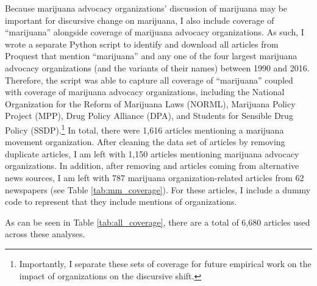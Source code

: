 Because marijuana advocacy organizations' discussion of marijuana may be important for discursive change on marijuana, I also include coverage of ``marijuana'' alongside coverage of marijuana advocacy organizations. As such, I wrote a separate Python script to identify and download all articles from Proquest that mention ``marijuana'' and any one of the four largest marijuana advocacy organizations (and the variants of their names) between 1990 and 2016. Therefore, the script was able to capture all coverage of ``marijuana'' coupled with coverage of marijuana advocacy organizations, including the National Organization for the Reform of Marijuana Laws (NORML), Marijuana Policy Project (MPP), Drug Policy Alliance (DPA), and Students for Sensible Drug Policy (SSDP).\footnote{Importantly, I separate these sets of coverage for future empirical work on the impact of organizations on the discursive shift.} In total, there were 1,616 articles mentioning a marijuana movement organization. After cleaning the data set of articles by removing duplicate articles, I am left with 1,150 articles mentioning marijuana advocacy organizations. In addition, after removing and articles coming from alternative news sources, I am left with 787 marijuana organization-related articles from 62 newspapers (see Table \ref{tab:mm_coverage}). For these articles, I include a dummy code to represent that they include mentions of organizations. 





As can be seen in Table \ref{tab:all_coverage}, there are a total of 6,680 articles used across these analyses. 




 


